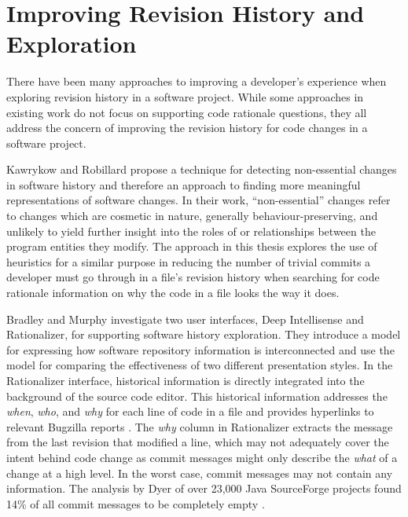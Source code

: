 \section{Improving Revision History and Exploration}

There have been many approaches to improving a developer's experience when exploring revision history in a software project. 
While some approaches in existing work do not focus on supporting code rationale questions, 
they all address the concern of improving the revision history for code changes in a software project.

Kawrykow and Robillard \cite{kawrykow_non-essential_2011} propose a technique for detecting non-essential changes in software history and therefore an approach to finding more meaningful representations of software changes.
In their work, ``non-essential'' changes refer to changes which are cosmetic in nature, generally behaviour-preserving, and unlikely to yield further insight into the roles of or relationships between the program entities they modify. 
The approach in this thesis explores the use of heuristics for a similar purpose in reducing the number of trivial commits a developer must go through in a file's revision history when searching for code rationale information on why the code in a file looks the way it does.

Bradley and Murphy \cite{bradley_supporting_2011} investigate two user interfaces, Deep Intellisense and Rationalizer, for supporting software history exploration.
They introduce a model for expressing how software repository information is interconnected and use the model for comparing the effectiveness of two different presentation styles.
In the Rationalizer interface, historical information is directly integrated into the background of the source code editor.
This historical information addresses the \emph{when}, \emph{who}, and \emph{why} for each line of code in a file and provides hyperlinks to relevant Bugzilla reports \cite{bradley_supporting_2011}.
The \emph{why} column in Rationalizer extracts the message from the last revision that modified a line, which may not adequately cover the intent behind code change as commit messages might only describe the \emph{what} of a change at a high level.
In the worst case, commit messages may not contain any information.
The analysis by Dyer \etal of over 23,000 Java SourceForge projects found 14\% of all commit messages to be completely empty \cite{dyer_boa_2013}.

